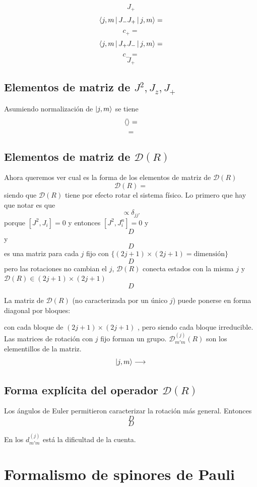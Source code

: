 \documentclass[10pt,oneside]{CBFT_book}
\begin{document}
\[
	J_+
\]
\[
	\Braket{j,m|J_-J_+|j,m} = 
\]
\[
	c_+ = 
\]
\[
	\Braket{j,m|J_+J_-|j,m} = 
\]
\[
	c_- =
\]
\[
	J_+
\]

\subsection{Elementos de matriz de $J^2, J_z, J_+$}

Asumiendo normalización de $\Ket{j,m}$ se tiene 
\[
	\Braket{} = 
\]
\[
	=
\]

\subsection{Elementos de matriz de $\mathcal{D}(R)$}

Ahora queremos ver cual es la forma de los elementos de matriz de $\mathcal{D}(R)$
\[
	\mathcal{D}(R) =
\]
siendo que $\mathcal{D}(R)$ tiene por efecto rotar el sistema físico.
Lo primero que hay que notar es que 
\[
	\propto \delta_{jj'}
\]
porque $[J^2,J_i]=0$ y entonces $[J^2,J_i^n]=0$ y 
\[
	D
\]
y 
\[
	D
\]
es una matriz para cada $j$ fijo con $\{ (2j+1)\times(2j+1)=\text{dimensión}\}$
\[
	D
\]
pero las rotaciones no cambian el $j$, $\mathcal{D}(R)$ conecta estados con la misma $j$ y $\mathcal{D}(R) 
\in (2j+1)\times(2j+1)$ 
\[
	D
\]

La matriz de $\mathcal{D}(R)$ (no caracterizada por un único $j$) puede ponerse en forma diagonal por bloques:


con cada bloque de $(2j+1)\times(2j+1)$ , pero siendo cada bloque irreducible. Las matrices de rotación con 
$j$ fijo forman un grupo. $\mathcal{D}_{m'm}^{(j)}(R)$ son los elementillos de la matriz.
\[
	\Ket{j,m} \longrightarrow
\]

\subsection{Forma explícita del operador $\mathcal{D}(R)$}

Los ángulos de Euler permitieron caracterizar la rotación más general. Entonces 
\[
	D
\]
\[
	D
\]

En los $d_{m'm}^{(j)}$ está la dificultad de la cuenta.

\section{Formalismo de spinores de Pauli}
\end{document}
